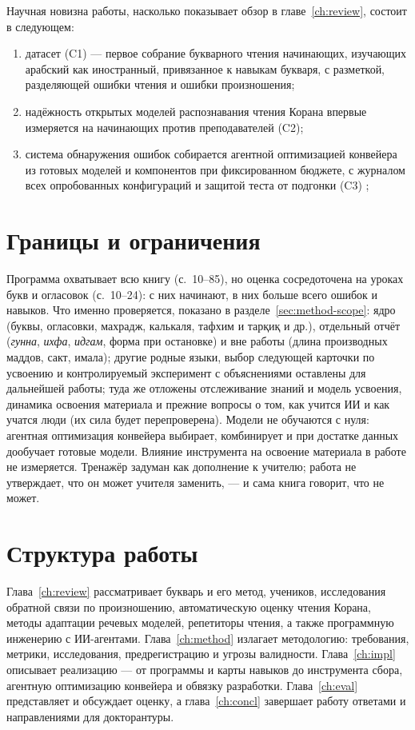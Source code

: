 Научная новизна работы, насколько показывает обзор в главе~\ref{ch:review}, состоит в следующем:
\begin{enumerate}
  \item датасет (C1) --- первое собрание букварного чтения начинающих, изучающих арабский как иностранный,
    привязанное к навыкам букваря, с разметкой, разделяющей ошибки чтения и ошибки произношения;
  \item надёжность открытых моделей распознавания чтения Корана впервые измеряется на начинающих против
    преподавателей (C2);
  \item система обнаружения ошибок собирается агентной оптимизацией конвейера из готовых моделей и компонентов
    при фиксированном бюджете, с журналом всех опробованных конфигураций и защитой теста от подгонки (C3)
    ;
\end{enumerate}

\section{Границы и ограничения}

Программа охватывает всю книгу (с.~10--85), но оценка сосредоточена на уроках букв и огласовок (с.~10--24):
с них начинают, в них больше всего ошибок и навыков. Что именно проверяется, показано в разделе~\ref{sec:method-scope}: ядро (буквы, огласовки, махрадж, калькаля, тафхим и тарқиқ и др.), отдельный отчёт (\emph{гунна}, \emph{ихфа}, \emph{идгам}, форма при остановке) и вне работы (длина производных маддов, сакт, имала); другие
родные языки, выбор следующей карточки по усвоению и контролируемый эксперимент с объяснениями оставлены для
дальнейшей работы; туда же отложены отслеживание знаний и модель усвоения, динамика освоения материала и
прежние вопросы о том, как учится ИИ и как учатся люди (их сила будет перепроверена). Модели не обучаются с нуля: агентная оптимизация конвейера выбирает,
комбинирует и при достатке данных дообучает готовые модели. Влияние инструмента на освоение материала в работе
не измеряется. Тренажёр задуман как дополнение к учителю; работа не утверждает, что он может учителя
заменить, --- и сама книга говорит, что не может.

\section{Структура работы}

Глава~\ref{ch:review} рассматривает букварь и его метод, учеников, исследования обратной связи по
произношению, автоматическую оценку чтения Корана, методы адаптации речевых моделей, репетиторы чтения, а также
программную инженерию с ИИ-агентами. Глава~\ref{ch:method} излагает
методологию: требования, метрики, исследования, предрегистрацию и угрозы валидности.
Глава~\ref{ch:impl} описывает реализацию --- от программы и карты навыков до инструмента сбора, агентную
оптимизацию конвейера и обвязку разработки. Глава~\ref{ch:eval} представляет и обсуждает оценку, а
глава~\ref{ch:concl} завершает работу ответами и направлениями для докторантуры.
